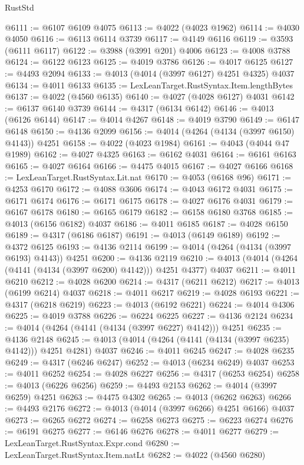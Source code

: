 \begin{lexlean}{RustStd}
\begin{coremodule}
@6111 := @6107 @6109 @4075
@6113 := @4022 (@4023 @1962)
@6114 := @4030 @4050
@6116 := @6113 @6114 @3739
@6117 := @4149 @6116
@6119 := @3593 (@6111 @6117)
@6122 := @3988 (@3991 @201) @4006
@6123 := @4008 @3788
@6124 := @6122 @6123
@6125 := @4019 @3786
@6126 := @4017 @6125
@6127 := @4493 @2094
@6133 := @4013 (@4014 (@3997 @6127) @4251 @4325) @4037
@6134 := @4011 @6133
@6135 := LexLeanTarget.RustSyntax.Item.lengthBytes
@6137 := @4022 (@4560 @6135)
@6140 := @4027 (@4028 @6127) @4031
@6142 := @6137 @6140 @3739
@6144 := @4317 (@6134 @6142)
@6146 := @4013 (@6126 @6144)
@6147 := @4014 @4267
@6148 := @4019 @3790
@6149 := @6147 @6148
@6150 := @4136 @2099
@6156 := @4014 (@4264 (@4134 (@3997 @6150) @4143)) @4251
@6158 := @4022 (@4023 @1984)
@6161 := @4043 (@4044 @47 @1989)
@6162 := @4027 @4325
@6163 := @6162 @4031
@6164 := @6161 @6163
@6165 := @4027 @6164
@6166 := @4475 @4015
@6167 := @4027 @6166
@6168 := LexLeanTarget.RustSyntax.Lit.nat
@6170 := @4053 (@6168 @96)
@6171 := @4253 @6170
@6172 := @4088 @3606
@6174 := @4043 @6172 @4031
@6175 := @6171 @6174
@6176 := @6171 @6175
@6178 := @4027 @6176 @4031
@6179 := @6167 @6178
@6180 := @6165 @6179
@6182 := @6158 @6180 @3768
@6185 := @4013 (@6156 @6182) @4037
@6186 := @4011 @6185
@6187 := @4028 @6150
@6189 := @4317 (@6186 @6187)
@6191 := @4013 (@6149 @6189)
@6192 := @4372 @6125
@6193 := @4136 @2114
@6199 := @4014 (@4264 (@4134 (@3997 @6193) @4143)) @4251
@6200 := @4136 @2119
@6210 := @4013 (@4014 (@4264 (@4141 (@4134 (@3997 @6200) @4142))) @4251 @4377) @4037
@6211 := @4011 @6210
@6212 := @4028 @6200
@6214 := @4317 (@6211 @6212)
@6217 := @4013 (@6199 @6214) @4037
@6218 := @4011 @6217
@6219 := @4028 @6193
@6221 := @4317 (@6218 @6219)
@6223 := @4013 (@6192 @6221)
@6224 := @4014 @4306
@6225 := @4019 @3788
@6226 := @6224 @6225
@6227 := @4136 @2124
@6234 := @4014 (@4264 (@4141 (@4134 (@3997 @6227) @4142))) @4251
@6235 := @4136 @2148
@6245 := @4013 (@4014 (@4264 (@4141 (@4134 (@3997 @6235) @4142))) @4251 @4281) @4037
@6246 := @4011 @6245
@6247 := @4028 @6235
@6249 := @4317 (@6246 @6247)
@6252 := @4013 (@6234 @6249) @4037
@6253 := @4011 @6252
@6254 := @4028 @6227
@6256 := @4317 (@6253 @6254)
@6258 := @4013 (@6226 @6256)
@6259 := @4493 @2153
@6262 := @4014 (@3997 @6259) @4251
@6263 := @4475 @4302
@6265 := @4013 (@6262 @6263)
@6266 := @4493 @2176
@6272 := @4013 (@4014 (@3997 @6266) @4251 @6166) @4037
@6273 := @6265 @6272
@6274 := @6258 @6273
@6275 := @6223 @6274
@6276 := @6191 @6275
@6277 := @6146 @6276
@6278 := @4011 @6277
@6279 := LexLeanTarget.RustSyntax.Expr.cond
@6280 := LexLeanTarget.RustSyntax.Item.natLt
@6282 := @4022 (@4560 @6280)

\end{coremodule}
\end{lexlean}
